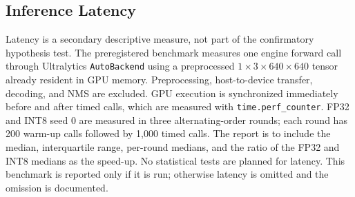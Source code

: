 \subsection{Inference Latency}
Latency is a secondary descriptive measure, not part of the confirmatory
hypothesis test. The preregistered benchmark measures one engine forward call
through Ultralytics \texttt{AutoBackend} using a preprocessed
$1 \times 3 \times 640 \times 640$ tensor already resident in GPU memory.
Preprocessing, host-to-device transfer, decoding, and NMS are excluded. GPU
execution is synchronized immediately before and after timed calls, which are
measured with \texttt{time.perf\_counter}. FP32 and INT8 seed 0 are measured in
three alternating-order rounds; each round has 200 warm-up calls followed by
1,000 timed calls. The report is to include the median, interquartile range,
per-round medians, and the ratio of the FP32 and INT8 medians as the speed-up.
No statistical tests are planned for latency. This benchmark is reported only
if it is run; otherwise latency is omitted and the omission is documented.
